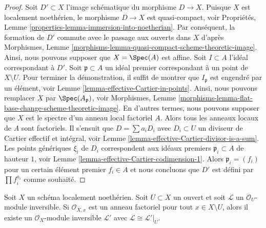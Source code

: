 \begin{proof}
Soit  $D' \subset X$  l'image schématique du morphisme  $D \to X$. Puisque
 $X$  est localement noethérien, le morphisme  $D \to X$  est
quasi-compact, voir Propriétés, Lemme  \ref{properties-lemma-immersion-into-noetherian}. Par conséquent, la formation
de  $D'$  commute avec le passage aux ouverts dans  $X$  d'après
Morphismes, Lemme  \ref{morphisms-lemma-quasi-compact-scheme-theoretic-image}. Ainsi, nous pouvons supposer que  $X = \Spec(A)$  est
affine. Soit  $I \subset A$  l'idéal correspondant à  $D'$. Soit  $\mathfrak p \subset A$ 
un idéal premier correspondant à un point de  $X \setminus U$. Pour terminer la
démonstration, il suffit de montrer que  $I_\mathfrak p$  est engendré par un élément,
voir Lemme  \ref{lemma-effective-Cartier-in-points}. Ainsi, nous pouvons remplacer  $X$  par
 $\Spec(A_\mathfrak p)$, voir Morphismes, Lemme  \ref{morphisms-lemma-flat-base-change-scheme-theoretic-image}. En d'autres termes, nous
pouvons supposer que  $X$  est le spectre d'un anneau local factoriel  $A$.
Alors tous les anneaux locaux de  $A$  sont factoriels. Il s'ensuit que
 $D = \sum a_i D_i$  avec  $D_i \subset U$  un diviseur de Cartier effectif et intégral, voir
Lemme  \ref{lemma-effective-Cartier-divisor-is-a-sum}. Les points génériques  $\xi_i$  de  $D_i$ 
correspondent aux idéaux premiers  $\mathfrak p_i \subset A$  de hauteur  $1$, voir Lemme
 \ref{lemma-effective-Cartier-codimension-1}. Alors  $\mathfrak p_i = (f_i)$  pour un certain élément premier  $f_i \in A$  et
nous concluons que  $D'$  est défini par  $\prod f_i^{a_i}$  comme souhaité.
\end{proof}

\begin{lemma}
\label{lemma-extend-invertible-module}
Soit  $X$  un schéma localement noethérien. Soit  $U \subset X$  un ouvert et
soit  $\mathcal{L}$  un  $\mathcal{O}_U$-module inversible. Si  $\mathcal{O}_{X, x}$  est un anneau factoriel
pour tout  $x \in X \setminus U$, alors il existe un  $\mathcal{O}_X$-module inversible
 $\mathcal{L}'$  avec  $\mathcal{L} \cong \mathcal{L}'|_U$.
\end{lemma}

